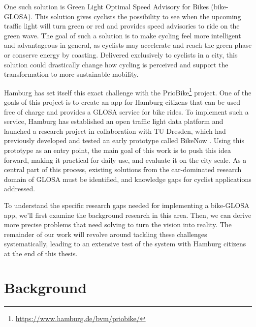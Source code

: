 One such solution is Green Light Optimal Speed Advisory for Bikes (bike-GLOSA). This solution gives cyclists the possibility to see when the upcoming traffic light will turn green or red and provides speed advisories to ride on the green wave. The goal of such a solution is to make cycling feel more intelligent and advantageous in general, as cyclists may accelerate and reach the green phase or conserve energy by coasting. Delivered exclusively to cyclists in a city, this solution could drastically change how cycling is perceived and support the transformation to more sustainable mobility.

Hamburg has set itself this exact challenge with the PrioBike\footnote{\url{https://www.hamburg.de/bvm/priobike/}} project. One of the goals of this project is to create an app for Hamburg citizens that can be used free of charge and provides a GLOSA service for bike rides. To implement such a service, Hamburg has established an open traffic light data platform and launched a research project in collaboration with TU Dresden, which had previously developed and tested an early prototype called BikeNow \cite{frohlich_bikenow_2016, frohlich_bike_2018}. Using this prototype as an entry point, the main goal of this work is to push this idea forward, making it practical for daily use, and evaluate it on the city scale. As a central part of this process, existing solutions from the car-dominated research domain of GLOSA must be identified, and knowledge gaps for cyclist applications addressed. 

To understand the specific research gaps needed for implementing a bike-GLOSA app, we'll first examine the background research in this area. Then, we can derive more precise problems that need solving to turn the vision into reality. The remainder of our work will revolve around tackling these challenges systematically, leading to an extensive test of the system with Hamburg citizens at the end of this thesis.

\section{Background}

